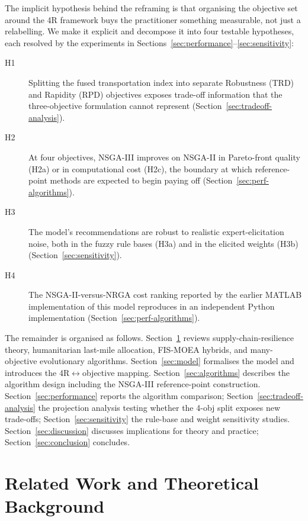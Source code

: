 \documentclass[applsci,article,submit,moreauthors,pdftex]{Definitions/mdpi}
\begin{document}
The implicit hypothesis behind the reframing is that organising the objective
set around the 4R framework buys the practitioner something measurable, not
just a relabelling. We make it explicit and decompose it into four testable
hypotheses, each resolved by the experiments in
Sections~\ref{sec:performance}--\ref{sec:sensitivity}:
\begin{description}
    \item[H1] Splitting the fused transportation index into separate Robustness
          (TRD) and Rapidity (RPD) objectives exposes trade-off information that
          the three-objective formulation cannot represent
          (Section~\ref{sec:tradeoff-analysis}).
    \item[H2] At four objectives, NSGA-III improves on NSGA-II in Pareto-front
          quality (H2a) or in computational cost (H2c), the boundary at which
          reference-point methods are expected to begin paying off
          (Section~\ref{sec:perf-algorithms}).
    \item[H3] The model's recommendations are robust to realistic
          expert-elicitation noise, both in the fuzzy rule bases (H3a) and in
          the elicited weights (H3b) (Section~\ref{sec:sensitivity}).
    \item[H4] The NSGA-II-versus-NRGA cost ranking reported by the earlier
          MATLAB implementation of this model reproduces in an independent
          Python implementation (Section~\ref{sec:perf-algorithms}).
\end{description}

The remainder is organised as follows. Section~\ref{sec:related} reviews
supply-chain-resilience theory, humanitarian last-mile allocation, FIS-MOEA
hybrids, and many-objective evolutionary algorithms. Section~\ref{sec:model}
formalises the model and introduces the 4R$\leftrightarrow$objective mapping.
Section~\ref{sec:algorithms} describes the algorithm design including the
NSGA-III reference-point construction. Section~\ref{sec:performance} reports
the algorithm comparison; Section~\ref{sec:tradeoff-analysis} the projection
analysis testing whether the 4-obj split exposes new trade-offs;
Section~\ref{sec:sensitivity} the rule-base and weight sensitivity studies.
Section~\ref{sec:discussion} discusses implications for theory and practice;
Section~\ref{sec:conclusion} concludes.

\section{Related Work and Theoretical Background}\label{sec:related}
\end{document}
